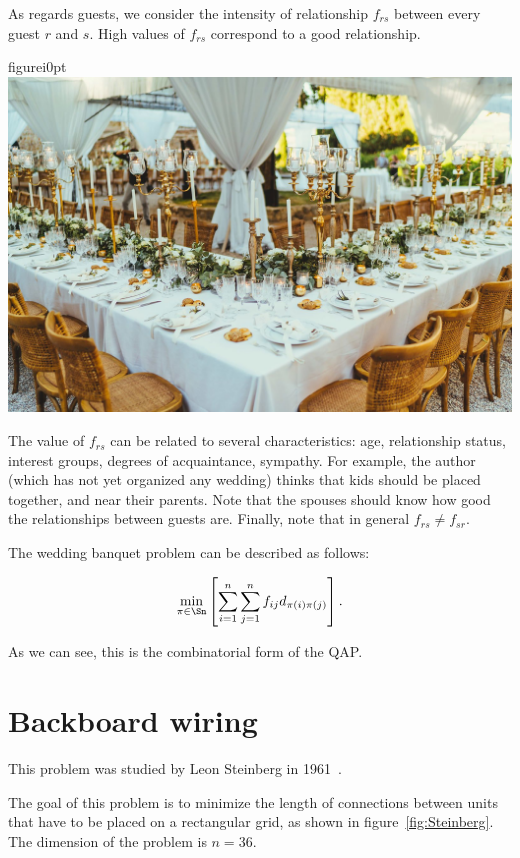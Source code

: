 \noindent As regards guests, we consider the intensity of relationship $f_{rs}$ between every guest $r$ and $s$. High values of $f_{rs}$ correspond to a good relationship. 
\begin{wrapfloat}{figure}{i}{0pt}
	\vspace{-10pt}
	\includegraphics[width=.20\textwidth]{Wedding_table}
	\vspace{-10pt}	
\end{wrapfloat}The value of $f_{rs}$ can be related to several characteristics: age, relationship status, interest groups, degrees of acquaintance, sympathy. For example, the author (which has not yet organized any wedding) thinks that kids should be placed together, and near their parents. Note that the spouses should know how good the relationships between guests are. Finally, note that in general $f_{rs}\neq f_{sr}$.

 
The wedding banquet problem can be described as follows:

\begin{equation}
\min_{\pi \in \Sn} \left[\sum_{i=1}^n\sum_{j=1}^n f_{ij}d_{\pi(i)\pi(j)}\right].
\end{equation}

\noindent As we can see, this is the  combinatorial form of the QAP.

\section{Backboard wiring}
\label{sec:BackboardWiring} 

This problem was studied by Leon Steinberg in 1961~\cite{Steinberg1961}. 

The goal of this problem is to minimize the length of connections between units that have to be placed on a rectangular grid, as shown in figure~\ref{fig:Steinberg}. The dimension of the problem is $n=36$.

